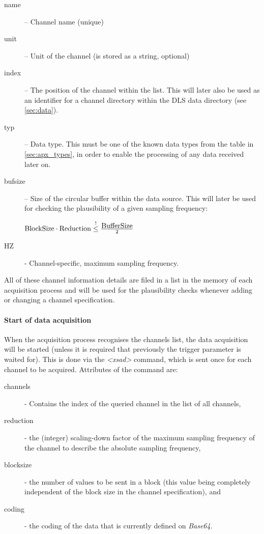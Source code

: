 \documentclass[a4paper,12pt,BCOR6mm,bibtotoc,idxtotoc]{scrbook}
\begin{document}
\begin{description}

\item[name] -- Channel name (unique)

\item[unit] -- Unit of the channel (is stored as a string, optional)

\item[index] -- The position of the channel within the list. This will later
also be used as an identifier for a channel directory within the DLS data
directory (see \autoref{sec:data}).

\item[typ] -- Data type. This must be one of the known data types from the
table in \autoref{sec:apx_types}, in order to enable the processing of any
data received later on.

\item[bufsize] -- Size of the circular buffer within the data source. This
will later be used for checking the plausibility of a given sampling
frequency:

$ \hbox{BlockSize} \cdot \hbox{Reduction} \stackrel{!}{\le} \frac{\hbox{BufferSize}}{2} $

\item[HZ] - Channel-specific, maximum sampling frequency.

\end{description}

All of these channel information details are filed in a list in the memory of
each acquisition process and will be used for the plausibility checks whenever
adding or changing a channel specification.

\paragraph{Start of data acquisition} When the acquisition process recognises
the channels list, the data acquisition will be started (unless it is required
that previously the trigger parameter is waited for). This is done via the
\textit{\textless xsad\textgreater} command, which is sent once for each
channel to be acquired. Attributes of the command are:

\begin{description}

\item[channels] - Contains the index of the queried channel in the list of all
channels,

\item[reduction] - the (integer) scaling-down factor of the maximum sampling
frequency of the channel to describe the absolute sampling frequency,

\item[blocksize] - the number of values to be sent in a block (this value
being completely independent of the block size in the channel specification),
and

\item[coding] - the coding of the data that is currently defined on
\textit{Base64}.

\end{description}
\end{document}
